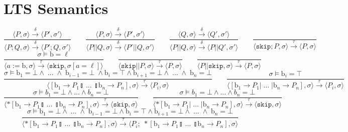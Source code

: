 \documentclass{article}
\begin{document}
\section{LTS Semantics}
$$
    \frac{\langle P, \sigma \rangle \xrightarrow{\delta} \langle P', \sigma' \rangle}{\langle P ; Q, \sigma \rangle \xrightarrow{\delta} \langle P' ; Q, \sigma' \rangle} \qquad
    \frac{\langle P, \sigma \rangle \xrightarrow{\delta} \langle P', \sigma' \rangle}{\langle P || Q, \sigma \rangle \xrightarrow{\delta} \langle P' || Q, \sigma' \rangle} \qquad
    \frac{\langle Q, \sigma \rangle \xrightarrow{\delta} \langle Q', \sigma' \rangle}{\langle P || Q, \sigma \rangle \xrightarrow{\delta} \langle P || Q', \sigma' \rangle} \qquad
    \frac{}{\langle \mathtt{skip}; P, \sigma \rangle \xrightarrow{\tau} \langle P, \sigma \rangle} $$$$
    \frac{\sigma \models \mathrm{b} = \ell}{\langle a := \mathrm{b}, \sigma \rangle \xrightarrow{\tau} \langle \mathtt{skip}, \sigma[a = \ell] \rangle} \qquad
    \frac{}{\langle \mathtt{skip} || P, \sigma \rangle \xrightarrow{\tau} \langle P, \sigma \rangle} \qquad
    \frac{}{\langle P || \mathtt{skip}, \sigma \rangle \xrightarrow{\tau} \langle P, \sigma \rangle} $$$$
    \frac{\sigma \models \mathrm{b}_1 = \bot \wedge \; \ldots \; \wedge \; \mathrm{b}_{i-1} = \bot \; \wedge \mathrm{b}_i = \top \wedge \mathrm{b}_{i+1} = \bot \wedge \; \ldots \; \wedge \; \mathrm{b}_n = \bot} {\langle [ \mathrm{b}_1 \rightarrow P_1  \talloblong \; \ldots \; \talloblong \mathrm{b}_n \rightarrow P_n ] , \sigma \rangle \xrightarrow{\tau} \langle P_i , \sigma\rangle  } \qquad
    \frac{\sigma \models \mathrm{b}_i = \top} {\langle [ \mathrm{b}_1 \rightarrow P_1  | \; \ldots \; | \mathrm{b}_n \rightarrow P_n ] , \sigma \rangle \xrightarrow{\tau} \langle P_i , \sigma\rangle  } $$$$
    \frac{\sigma \models b_1 = \bot \wedge \ldots \wedge b_n = \bot}{\langle *[ \mathrm{b}_1 \rightarrow P_1  \talloblong \; \ldots \; \talloblong \mathrm{b}_n \rightarrow P_n ] , \sigma \rangle \xrightarrow{\tau} \langle \mathtt{skip} , \sigma\rangle } \qquad
    \frac{\sigma \models b_1 = \bot \wedge \ldots \wedge b_n = \bot}{\langle *[ \mathrm{b}_1 \rightarrow P_1  | \; \ldots \; | \mathrm{b}_n \rightarrow P_n ] , \sigma \rangle \xrightarrow{\tau} \langle \mathtt{skip} , \sigma \rangle } $$$$
    \frac{\sigma \models \mathrm{b}_1 = \bot \wedge \; \ldots \; \wedge \; \mathrm{b}_{i-1} = \bot \wedge \mathrm{b}_i = \top \wedge \mathrm{b}_{i+1} = \bot \wedge \; \ldots \; \wedge \; \mathrm{b}_n = \bot} {\langle *[ \mathrm{b}_1 \rightarrow P_1  \talloblong \; \ldots \; \talloblong \mathrm{b}_n \rightarrow P_n ] , \sigma \rangle \xrightarrow{\tau} \langle P_i; \; *[ \mathrm{b}_1 \rightarrow P_1  \talloblong \; \ldots \; \talloblong \mathrm{b}_n \rightarrow P_n ] , \sigma\rangle  } $$$$
$$
\end{document}

